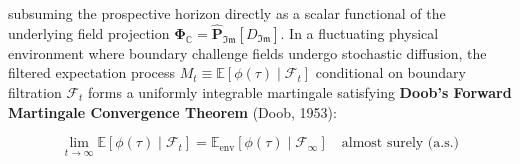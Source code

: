 \documentclass[11pt,a4paper]{article}
\theoremstyle{definition}\newtheorem{definition}{Definition}
\theoremstyle{remark}\newtheorem{remark}{Remark}
\begin{document}
subsuming the prospective horizon directly as a scalar functional of the underlying field projection $\mathbf{\Phi}_{\mathbb{C}} = \hat{\mathbf{P}}_{\mathfrak{Im}}[D_{\mathfrak{Im}}]$. In a fluctuating physical environment where boundary challenge fields undergo stochastic diffusion, the filtered expectation process $M_t \equiv \mathbb{E}[\phi(\tau) \mid \mathcal{F}_t]$ conditional on boundary filtration $\mathcal{F}_t$ forms a uniformly integrable martingale satisfying \textbf{Doob's Forward Martingale Convergence Theorem} (Doob, 1953):


\begin{equation}
\boxed{\lim_{t \to \infty} \mathbb{E}[ \phi(\tau) \;\Big|\; \mathcal{F}_t ] = \mathbb{E}_{\text{env}}[ \phi(\tau) \;\Big|\; \mathcal{F}_\infty ] \quad \text{almost surely (a.s.)}}
\end{equation}
\end{document}
